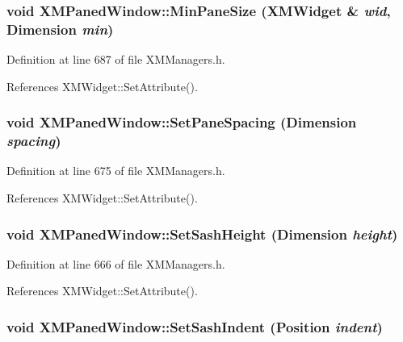 \subsubsection{\setlength{\rightskip}{0pt plus 5cm}void XMPaned\-Window::Min\-Pane\-Size ({\bf XMWidget} \& {\em wid}, Dimension {\em min})\hspace{0.3cm}{\tt  [inline]}}\label{classXMPanedWindow_a11}




Definition at line 687 of file XMManagers.h.

References XMWidget::Set\-Attribute().
\subsubsection{\setlength{\rightskip}{0pt plus 5cm}void XMPaned\-Window::Set\-Pane\-Spacing (Dimension {\em spacing})\hspace{0.3cm}{\tt  [inline]}}\label{classXMPanedWindow_a8}




Definition at line 675 of file XMManagers.h.

References XMWidget::Set\-Attribute().
\subsubsection{\setlength{\rightskip}{0pt plus 5cm}void XMPaned\-Window::Set\-Sash\-Height (Dimension {\em height})\hspace{0.3cm}{\tt  [inline]}}\label{classXMPanedWindow_a5}




Definition at line 666 of file XMManagers.h.

References XMWidget::Set\-Attribute().
\subsubsection{\setlength{\rightskip}{0pt plus 5cm}void XMPaned\-Window::Set\-Sash\-Indent (Position {\em indent})\hspace{0.3cm}{\tt  [inline]}}\label{classXMPanedWindow_a6}




